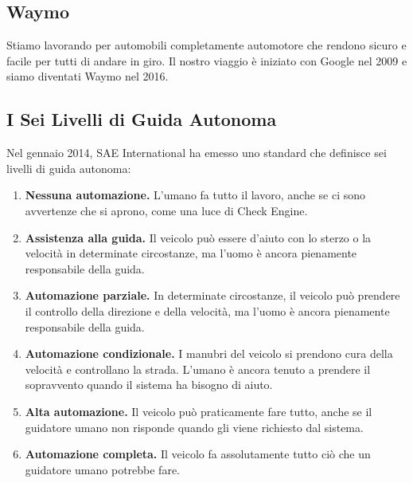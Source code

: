 \documentclass[a4paper,portrait,12pt]{article}
\theoremstyle{definition}
\begin{document}
\subsection{Waymo}
Stiamo lavorando per automobili completamente automotore che rendono sicuro e facile per tutti di andare in giro.
Il nostro viaggio è iniziato con Google nel 2009 e siamo diventati Waymo nel 2016.

\subsection{I Sei Livelli di Guida Autonoma}
Nel gennaio 2014, SAE International ha emesso uno standard che definisce sei livelli di guida autonoma:
\begin{enumerate}
\item \textbf{Nessuna automazione.} L'umano fa tutto il lavoro, anche se ci sono avvertenze che si aprono, come una luce di Check Engine.
\item \textbf{Assistenza alla guida.} Il veicolo può essere d'aiuto con lo sterzo o la velocità in determinate circostanze, ma l'uomo è ancora pienamente responsabile della guida.
\item \textbf{Automazione parziale.} In determinate circostanze, il veicolo può prendere il controllo della direzione e della velocità, ma l'uomo è ancora pienamente responsabile della guida.
\item \textbf{Automazione condizionale.} I manubri del veicolo si prendono cura della velocità e controllano la strada. L'umano è ancora tenuto a prendere il sopravvento quando il sistema ha bisogno di aiuto.
\item \textbf{Alta automazione.} Il veicolo può praticamente fare tutto, anche se il guidatore umano non risponde quando gli viene richiesto dal sistema.
\item \textbf{Automazione completa.} Il veicolo fa assolutamente tutto ciò che un guidatore umano potrebbe fare.
\end{enumerate}

\end{document}

